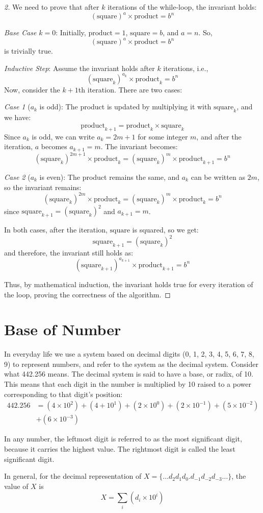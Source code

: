 \documentclass[
	12pt, %
	fleqn, %
	a4paper, %
]{LegrandOrangeBook}
\begin{document}
\begin{proof}[2]
    We need to prove that after \(k\) iterations of the while-loop, the invariant holds:
\[
(\text{square})^a \times \text{product} = b^n
\]

\textit{Base Case} \(k=0\):
Initially, \(\text{product} = 1\), \(\text{square} = b\), and \(a = n\). So,
\[
(\text{square})^a \times \text{product} = b^n
\]
is trivially true.

\textit{Inductive Step}:
Assume the invariant holds after \(k\) iterations, i.e.,
\[
(\text{square}_k)^{a_k} \times \text{product}_k = b^n
\]
Now, consider the \(k+1\)th iteration. There are two cases:

\textit{Case 1} (\(a_k\) is odd):
The product is updated by multiplying it with \(\text{square}_k\), and we have:
\[
\text{product}_{k+1} = \text{product}_k \times \text{square}_k
\]
Since \(a_k\) is odd, we can write \(a_k = 2m + 1\) for some integer \(m\), and after the iteration, \(a\) becomes \(a_{k+1} = m\). The invariant becomes:
\[
(\text{square}_k)^{2m+1} \times \text{product}_k = (\text{square}_k)^m \times \text{product}_{k+1} = b^n
\]

\textit{Case 2} (\(a_k\) is even):
The product remains the same, and \(a_k\) can be written as \(2m\), so the invariant remains:
\[
(\text{square}_k)^{2m} \times \text{product}_k = (\text{square}_k)^m \times \text{product}_k = b^n
\]
since \(\text{square}_{k+1} = (\text{square}_k)^2\) and \(a_{k+1} = m\).

In both cases, after the iteration, \(\text{square}\) is squared, so we get:
\[
\text{square}_{k+1} = (\text{square}_k)^2
\]
and therefore, the invariant still holds as:
\[
(\text{square}_{k+1})^{a_{k+1}} \times \text{product}_{k+1} = b^n
\]

Thus, by mathematical induction, the invariant holds true for every iteration of the loop, proving the correctness of the algorithm.
\end{proof}
\section{Base of Number}
In everyday life we use a system based on decimal digits (0, 1, 2, 3, 4, 5, 6, 7, 8, 9) to
represent numbers, and refer to the system as the decimal system. Consider what 442.256 means.
The decimal system is said to have a base, or radix, of 10. This means that each digit
in the number is multiplied by 10 raised to a power corresponding to that digit's
position:
$$\begin{aligned}442.256&=(4\times10^2)+(4+10^1)+(2\times10^0)+(2\times10^{-1})+(5\times10^{-2})\\&+(6\times10^{-3})\end{aligned}$$
\begin{definition}
    In any number, the leftmost digit is referred to as the most significant digit,
because it carries the highest value. The rightmost digit is called the least significant
digit.
\end{definition}
In general, for the decimal representation of \( X = \{ \ldots d_2d_1d_0.d_{-1}d_{-2}d_{-3} \ldots \} \), the value of \( X \) is
\[
X = \sum_i (d_i \times 10^i)
\]
\end{document}
